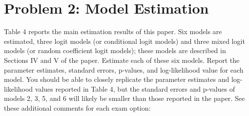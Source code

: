 \documentclass[11pt,letterpaper]{article}
\begin{document}
\section*{Problem 2: Model Estimation}

Table 4 reports the main estimation results of this paper. Six models are estimated, three logit models (or conditional logit models) and three mixed logit models (or random coefficient logit models); these models are described in Sections IV and V of the paper. Estimate each of these six models. Report the parameter estimates, standard errors, p-values, and log-likelihood value for each model. You should be able to closely replicate the parameter estimates and log-likelihood values reported in Table 4, but the standard errors and p-values of models 2, 3, 5, and 6 will likely be smaller than those reported in the paper. See these additional comments for each exam option:
\end{document}
